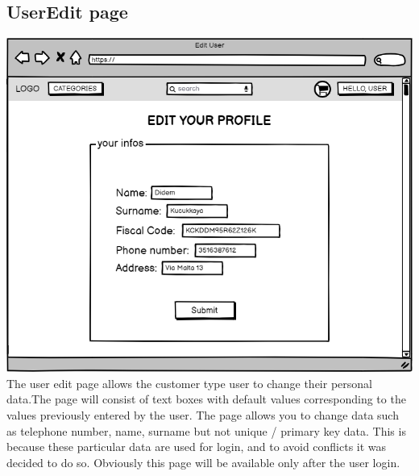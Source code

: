 \subsection{UserEdit page}
    \includegraphics[width=\textwidth,height=\textheight,keepaspectratio]{mockups/userEditPageMockup.png}
\\
The user edit page allows the customer type user to change their personal data.The page will consist of text boxes with default values corresponding to the values previously entered by the user. The page allows you to change data such as telephone number, name, surname but not unique / primary key data. This is because these particular data are used for login, and to avoid conflicts it was decided to do so.
Obviously this page will be available only after the user login.
    
